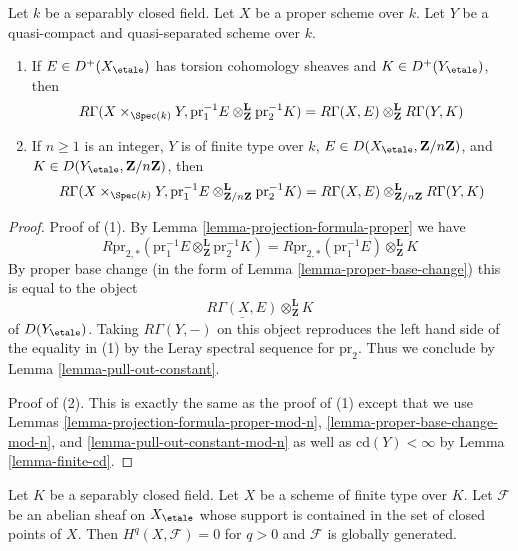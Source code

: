 \begin{lemma}
\label{lemma-kunneth-one-proper}
Let $k$ be a separably closed field. Let $X$ be a proper scheme over $k$.
Let $Y$ be a quasi-compact and quasi-separated scheme over $k$.
\begin{enumerate}
\item If $E \in D^+(X_\etale)$ has torsion cohomology sheaves and
$K \in D^+(Y_\etale)$, then
$$
R\Gamma(X \times_{\Spec(k)} Y,
\text{pr}_1^{-1}E
\otimes_\mathbf{Z}^\mathbf{L}
\text{pr}_2^{-1}K
)
=
R\Gamma(X, E)
\otimes_\mathbf{Z}^\mathbf{L}
R\Gamma(Y, K)
$$
\item If $n \geq 1$ is an integer, $Y$ is of finite type over $k$,
$E \in D(X_\etale, \mathbf{Z}/n\mathbf{Z})$, and
$K \in D(Y_\etale, \mathbf{Z}/n\mathbf{Z})$, then
$$
R\Gamma(X \times_{\Spec(k)} Y,
\text{pr}_1^{-1}E
\otimes_{\mathbf{Z}/n\mathbf{Z}}^\mathbf{L}
\text{pr}_2^{-1}K
)
=
R\Gamma(X, E)
\otimes_{\mathbf{Z}/n\mathbf{Z}}^\mathbf{L}
R\Gamma(Y, K)
$$
\end{enumerate}
\end{lemma}

\begin{proof}
Proof of (1). By Lemma \ref{lemma-projection-formula-proper} we have
$$
R\text{pr}_{2, *}(
\text{pr}_1^{-1}E
\otimes_\mathbf{Z}^\mathbf{L}
\text{pr}_2^{-1}K) =
R\text{pr}_{2, *}(\text{pr}_1^{-1}E)
\otimes_\mathbf{Z}^\mathbf{L}
K
$$
By proper base change (in the form of Lemma \ref{lemma-proper-base-change})
this is equal to the object
$$
\underline{R\Gamma(X, E)}
\otimes_\mathbf{Z}^\mathbf{L}
K
$$
of $D(Y_\etale)$. Taking $R\Gamma(Y, -)$ on this object reproduces the
left hand side of the equality in (1) by the Leray spectral sequence
for $\text{pr}_2$. Thus we conclude by
Lemma \ref{lemma-pull-out-constant}.

\medskip\noindent
Proof of (2). This is exactly the same as the proof of (1)
except that we use Lemmas \ref{lemma-projection-formula-proper-mod-n},
\ref{lemma-proper-base-change-mod-n}, and
\ref{lemma-pull-out-constant-mod-n} as well as
$\text{cd}(Y) < \infty$ by Lemma \ref{lemma-finite-cd}.
\end{proof}

\begin{lemma}
\label{lemma-supported-in-closed-points}
Let $K$ be a separably closed field. Let $X$ be a scheme of finite
type over $K$. Let $\mathcal{F}$ be an abelian sheaf on $X_\etale$
whose support is contained in the set of closed points of $X$.
Then $H^q(X, \mathcal{F}) = 0$ for $q > 0$ and $\mathcal{F}$
is globally generated.
\end{lemma}

